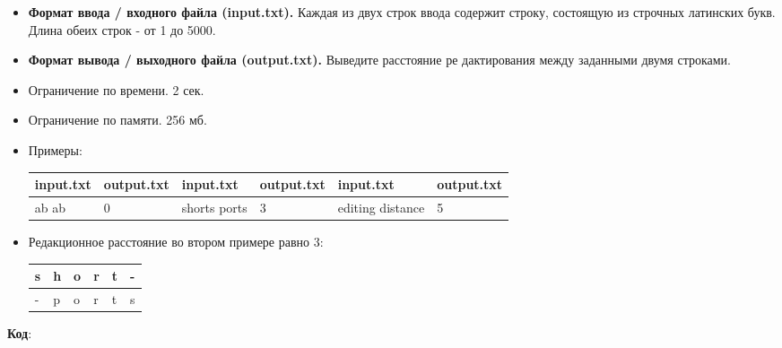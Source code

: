 \begin{itemize}
    \item \textbf{Формат ввода / входного файла (input.txt).} Каждая из двух строк ввода содержит строку, состоящую из строчных латинских букв. Длина обеих строк - от 1 до 5000.
	\item \textbf{Формат вывода / выходного файла (output.txt).} Выведите расстояние ре дактирования между заданными двумя строками.
	\item Ограничение по времени. 2 сек.
	\item Ограничение по памяти. 256 мб.
	\item Примеры:

    \begin{tabular}{|p{2cm}|l|p{2cm}|l|p{2cm}|l|}
        \hline
        input.txt & output.txt & input.txt & output.txt & input.txt & output.txt \\ \hline
        ab \newline ab & 0 & shorts \newline ports & 3 & editing \newline distance & 5 \\ \hline
    \end{tabular}
	\item Редакционное расстояние во втором примере равно 3:

    \begin{tabular}{|l|l|l|l|l|l|}
        \hline
        s & h & o & r & t & - \\ \hline
        - & p & o & r & t & s \\ \hline
    \end{tabular}
\end{itemize}
\textbf{Код}:

